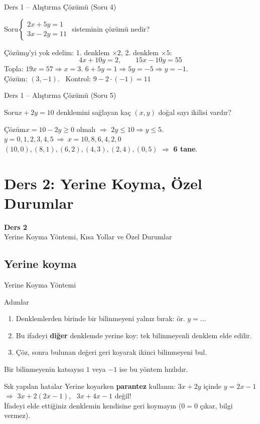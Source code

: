 \documentclass[aspectratio=169,11pt]{beamer}
\newcommand{\soru}[3]{%
\begin{frame}{#1}
  \begin{block}{Soru}\large #2\end{block}
  \pause
  \begin{exampleblock}{Çözüm}\large #3\end{exampleblock}
\end{frame}}
\begin{document}
\soru{Ders 1 -- Alıştırma Çözümü (Soru 4)}
{\(\begin{cases}2x+5y=1\\ 3x-2y=11\end{cases}\) \quad sisteminin çözümü nedir?}
{\(y\)'yi yok edelim: 1. denklem \(\times 2\), 2. denklem \(\times 5\):
\[4x+10y=2,\qquad 15x-10y=55\]
Topla: \(19x=57\Rightarrow x=3\). \quad \(6+5y=1\Rightarrow 5y=-5\Rightarrow y=-1\).\\[3pt]
Çözüm: \((3,-1)\). \ Kontrol: \(9-2\cdot(-1)=11\) \checkmark}

\soru{Ders 1 -- Alıştırma Çözümü (Soru 5)}
{\(x+2y=10\) denklemini sağlayan kaç \((x,y)\) doğal sayı ikilisi vardır?}
{\(x=10-2y\ge 0\) olmalı \(\Rightarrow\) \(2y\le 10\Rightarrow y\le 5\).\\[3pt]
\(y=0,1,2,3,4,5\ \Rightarrow\ x=10,8,6,4,2,0\)\\[3pt]
\((10,0),(8,1),(6,2),(4,3),(2,4),(0,5)\) \(\Rightarrow\) \textbf{6 tane}.}

\section{Ders 2: Yerine Koyma, Özel Durumlar}
\begin{frame}
\centering\Large\color{anamavi}\textbf{Ders 2}\\[6pt]\normalsize Yerine Koyma Yöntemi, Kısa Yollar ve Özel Durumlar
\end{frame}

\subsection{Yerine koyma}
\begin{frame}{Yerine Koyma Yöntemi}
\begin{block}{Adımlar}
\begin{enumerate}
\item Denklemlerden birinde bir bilinmeyeni yalnız bırak: ör. \(y=\dots\)
\item Bu ifadeyi \textbf{diğer} denklemde yerine koy: tek bilinmeyenli denklem elde edilir.
\item Çöz, sonra bulunan değeri geri koyarak ikinci bilinmeyeni bul.
\end{enumerate}
Bir bilinmeyenin katsayısı \(1\) veya \(-1\) ise bu yöntem hızlıdır.
\end{block}
\begin{alertblock}{Sık yapılan hatalar}
Yerine koyarken \textbf{parantez} kullanın: \(3x+2y\) içinde \(y=2x-1\) \(\Rightarrow\) \(3x+2(2x-1)\), \ \(3x+4x-1\) değil!\\
İfadeyi elde ettiğiniz denklemin kendisine geri koymayın (\(0=0\) çıkar, bilgi vermez).
\end{alertblock}
\end{frame}
\end{document}
